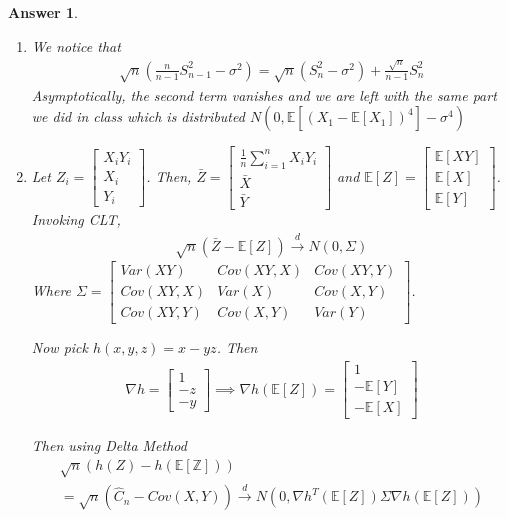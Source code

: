 \documentclass[12pt]{article}
\theoremstyle{colon}
\newtheorem*{answer}{Answer}
\begin{document}
\begin{answer}
  \leavevmode
  \begin{enumerate}[label=\arabic*)]
    \item We notice that
      \begin{gather*}
        \sqrt{n}(\frac{n}{n-1} S_{n-1}^2 - \sigma^2) = \sqrt{n}(S_n^2 - \sigma^2) + \frac{\sqrt{n}}{n-1} S_n^2
      \end{gather*}
      Asymptotically, the second term vanishes and we are left with the same part we did in class which is distributed $N(0, \mathbb{E}[(X_1 - \mathbb{E}[X_1])^4] - \sigma^4)$
    \item Let $Z_i = \begin{bmatrix} X_i Y_i \\ X_i \\ Y_i \end{bmatrix}$. Then, $\bar{Z} = \begin{bmatrix} \frac{1}{n} \sum_{i=1}^n X_i Y_i \\ \bar{X} \\ \bar{Y} \end{bmatrix}$ and $\mathbb{E}[Z] = \begin{bmatrix} \mathbb{E}[X Y] \\ \mathbb{E}[X] \\ \mathbb{E}[Y] \end{bmatrix}$. Invoking CLT,
      \begin{gather*}
        \sqrt{n}(\bar{Z} - \mathbb{E}[Z]) \xrightarrow{d} N(0, \Sigma)
      \end{gather*}
      Where $\Sigma = \begin{bmatrix} Var(XY) & Cov(XY, X) & Cov(XY, Y) \\ Cov(XY, X) & Var(X) & Cov(X,Y) \\ Cov(XY, Y) & Cov(X,Y) & Var(Y) \end{bmatrix}$.

      Now pick $h(x,y,z) = x - yz$. Then
      \begin{gather*}
        \nabla h = \begin{bmatrix}
          1 \\
          -z \\
          -y
        \end{bmatrix} \implies \nabla h(\mathbb{E}[Z]) = \begin{bmatrix}
          1 \\
          -\mathbb{E}[Y] \\
          -\mathbb{E}[X]
        \end{bmatrix}
      \end{gather*}

      Then using Delta Method
      \begin{gather*}
        \sqrt{n}(h(Z) - h(\mathbb{\mathbb{E}[Z]})) \\
        = \sqrt{n}(\widehat{C}_n - Cov(X,Y)) \xrightarrow{d} N(0, \nabla h^T(\mathbb{E}[Z]) \Sigma \nabla h(\mathbb{E}[Z]))
      \end{gather*}
  \end{enumerate}
\end{answer}
\end{document}
